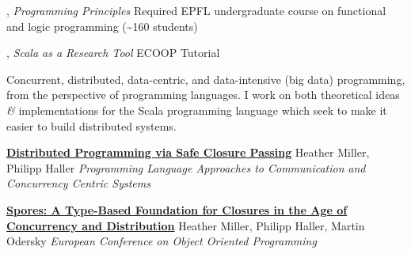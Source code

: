 \documentclass[9pt]{article}
\begin{document}
, {\em Programming Principles} 
\newline\noindent Required EPFL undergraduate course on functional and logic programming
\newline\noindent (\textasciitilde160 students)
\bigskip

, {\em Scala as a Research Tool} 
\newline\noindent ECOOP Tutorial
\bigskip



\noindent Concurrent, distributed, data-centric, and data-intensive (big data) programming, from the perspective of programming languages. I work on both theoretical ideas {\em \&} implementations for the Scala programming language which seek to make it easier to build distributed systems.



\bigskip



\noindent\href{http://infoscience.epfl.ch/record/191239}{\bf Distributed Programming via Safe Closure Passing}
\newline\noindent Heather Miller, Philipp Haller
\newline\noindent\emph{Programming Language Approaches to Communication}
\newline\noindent\emph{and Concurrency Centric Systems}
\bigskip

\noindent\href{http://infoscience.epfl.ch/record/191239}{\bf Spores: A Type-Based Foundation for Closures in the Age of}\vspace{-0.03in}
\newline\noindent\href{http://infoscience.epfl.ch/record/191239}{\bf Concurrency and Distribution}
\newline\noindent Heather Miller, Philipp Haller, Martin Odersky
\newline\noindent\emph{European Conference on Object Oriented Programming}
\bigskip
\end{document}
